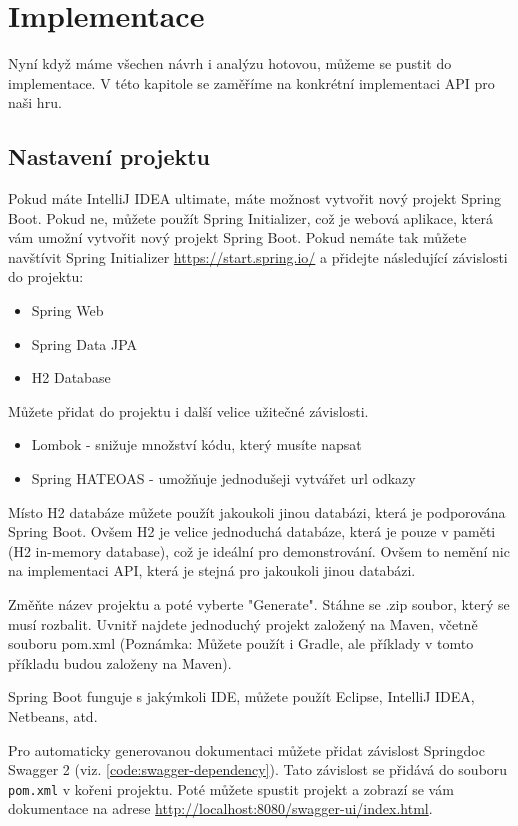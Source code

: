 \section{Implementace}
Nyní když máme všechen návrh i analýzu hotovou, můžeme se pustit do implementace. V této kapitole se zaměříme na konkrétní implementaci API pro naši hru.

\subsection{Nastavení projektu}

Pokud máte IntelliJ IDEA ultimate, máte možnost vytvořit nový projekt Spring Boot. Pokud ne, můžete použít Spring Initializer, což je webová aplikace, která vám umožní vytvořit nový projekt Spring Boot.
Pokud nemáte tak můžete navštívit Spring Initializer \url{https://start.spring.io/} a přidejte následující závislosti do projektu:

\begin{itemize}
    \item Spring Web
    \item Spring Data JPA
    \item H2 Database
\end{itemize}

Můžete přidat do projektu i další velice užitečné závislosti.
\begin{itemize}
    \item Lombok - snižuje množství kódu, který musíte napsat
    \item Spring HATEOAS - umožňuje jednodušeji vytvářet url odkazy
\end{itemize}

Místo H2 databáze můžete použít jakoukoli jinou databázi, která je podporována Spring Boot. Ovšem H2 je velice jednoduchá databáze, která je pouze v paměti (H2 in-memory database), což je ideální pro demonstrování. Ovšem to nemění nic na implementaci API, která je stejná pro jakoukoli jinou databázi.

Změňte název projektu a poté vyberte "Generate". Stáhne se .zip soubor, který se musí rozbalit. Uvnitř najdete jednoduchý projekt založený na Maven, včetně souboru pom.xml (Poznámka: Můžete použít i Gradle, ale příklady v tomto příkladu budou založeny na Maven).

Spring Boot funguje s jakýmkoli IDE, můžete použít Eclipse, IntelliJ IDEA, Netbeans, atd.

Pro automaticky generovanou dokumentaci můžete přidat závislost Springdoc Swagger 2 (viz. \ref{code:swagger-dependency}). Tato závislost se přidává do souboru \texttt{pom.xml} v kořeni projektu.
Poté můžete spustit projekt a zobrazí se vám dokumentace na adrese \url{http://localhost:8080/swagger-ui/index.html}.

